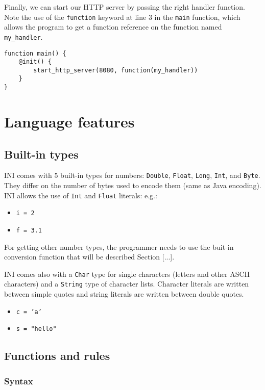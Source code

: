 \documentclass[11pt]{article}
\begin{document}
Finally, we can start our HTTP server by passing the right handler function. Note the use of the \texttt{function} keyword at line 3 in the \texttt{main} function, which allows the program to get a function reference on the function named \texttt{my\_handler}.

\begin{lstlisting}
function main() {
	@init() {
		start_http_server(8080, function(my_handler))
	}
}
\end{lstlisting}

\section{Language features}

\subsection{Built-in types}

INI comes with 5 built-in types for numbers: \texttt{Double}, \texttt{Float}, \texttt{Long}, \texttt{Int}, and \texttt{Byte}. They differ on the number of bytes used to encode them (same as Java encoding). INI allows the use of \texttt{Int} and \texttt{Float} literals: e.g.:

\begin{itemize}
\item \texttt{i = 2}
\item \texttt{f = 3.1}
\end{itemize}

For getting other number types, the programmer needs to use the buit-in conversion function that will be described Section [...].

INI comes also with a \texttt{Char} type for single characters (letters and other ASCII characters) and a \texttt{String} type of character lists. Character literals are written between simple quotes and string literals are written between double quotes.

\begin{itemize}
\item \texttt{c = 'a'}
\item \texttt{s = "hello"}
\end{itemize}

\subsection{Functions and rules}

\subsubsection{Syntax}
\end{document}
